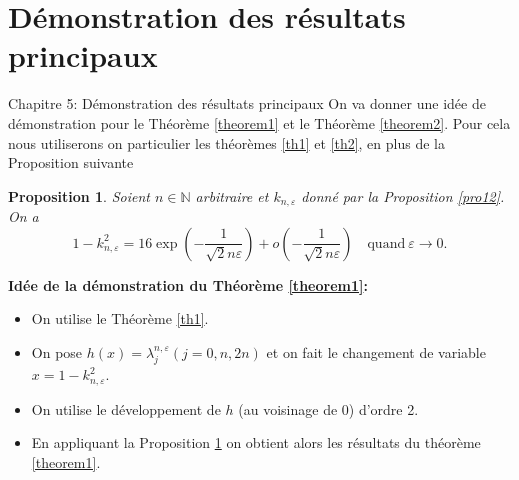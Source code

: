 \documentclass[mathserif,10pt]{beamer}
\newtheorem{proposition}{Proposition}
\begin{document}
\section{Démonstration des résultats principaux }
\begin{frame}{}\transglitter[duration=1]
\begin{center}
\end{center}
\end{frame}
\begin{frame}{Chapitre 5: Démonstration des résultats principaux }\transglitter[duration=1]
On va donner une idée  de démonstration pour le
Théorème \ref{theorem1} et le Théorème \ref{theorem2}. Pour cela nous utiliserons on particulier les théorèmes  \ref{th1} et \ref{th2}, en plus de la Proposition  suivante 


\pause
\begin{exampleblock}{}
\begin{proposition}\label{prop5.1}
Soient $n \in \mathbb{N}$ arbitraire et  $k_{n,\varepsilon }$ donné par la Proposition \ref{pro12}. 
On a
$$ 
1-k_{n,\varepsilon }^{2}=16\exp \left( -\dfrac{1}{\sqrt{2}n\varepsilon }\right)+o\left(-\dfrac{1}{\sqrt{2}n\varepsilon }\right)\quad \mathrm{ quand }\
\varepsilon \to 0.
$$
\end{proposition}
\end{exampleblock}
\pause
\textbf{Idée de la démonstration du Théorème \ref{theorem1}:}\pause
\begin{itemize}
\item On utilise le Théorème \ref{th1}.\pause
\item On pose $ h(x)= \lambda_{j}^{n,\varepsilon } (j= 0,n,2n)$ et on fait le changement de variable $ x = 1-k_{n,\varepsilon}^{2} $.\pause
\item On utilise le développement de $h$ (au voisinage de 0) d'ordre 2.\pause
\item En appliquant la Proposition \ref{prop5.1} on obtient alors les résultats du théorème \ref{theorem1}.
\end{itemize}
\end{frame}
\end{document}
